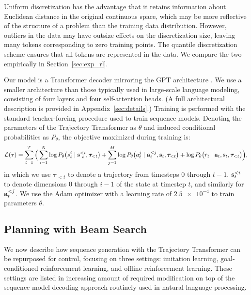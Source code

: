 Uniform discretization has the advantage that it retains information about Euclidean distance in the original continuous space, which may be more reflective of the structure of a problem than the training data distribution.
However, outliers in the data may have outsize effects on the discretization size, leaving many tokens corresponding to zero training points.
The quantile discretization scheme ensures that all tokens are represented in the data.
We compare the two empirically in Section~\ref{sec:exp_rl}.

Our model is a Transformer decoder mirroring the GPT architecture \citep{radford2018improving}.
We use a smaller architecture than those typically used in large-scale language modeling, consisting of four layers and four self-attention heads.
(A full architectural description is provided in Appendix~\ref{sec:details}.)
Training is performed with the standard teacher-forcing procedure \citep{williams1989learning} used to train sequence models.
Denoting the parameters of the Trajectory Transformer as $\theta$ and induced conditional probabilities as $P_\theta$, the objective maximized during training is:
\[
\mathcal{L}(\tau) = 
    \sum_{t=1}^{T} \Big(
    \sum_{i=1}^{N} \log P_\theta\big(s_{t}^i \mid         
        \mathbf{s}_{~t}^{<i},
        \bm{\tau}_{<t}
        \big) +
    \sum_{j=1}^{M} \log P_\theta\big(a_{t}^j \mid
        \mathbf{a}_{t}^{<j},
        \mathbf{s}_{t},
        \bm{\tau}_{<t}
        \big) +
    \log P_\theta\big(r_t \mid
        \mathbf{a}_t,
        \mathbf{s}_t,
        \bm{\tau}_{<t}
    \big)
    \Big),
\]
in which we use $\bm{\tau}_{<t}$ to denote a trajectory from timesteps $0$ through $t-1$, $\mathbf{s}_t^{<i}$ to denote dimensions $0$ through $i-1$ of the state at timestep $t$, and similarly for $\mathbf{a}_t^{<j}$.
We use the Adam optimizer \citep{ba2015adam} with a learning rate of $\num{2.5e-4}$ to train parameters $\theta$.

\subsection{Planning with Beam Search}
\label{sec:tto}

We now describe how sequence generation with the Trajectory Transformer can be repurposed for control, focusing on three settings: imitation learning, goal-conditioned reinforcement learning, and offline reinforcement learning.
These settings are listed in increasing amount of required modification on top of the sequence model decoding approach routinely used in natural language processing.

